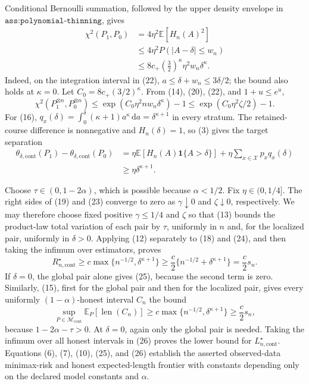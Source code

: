 Conditional Bernoulli summation, followed by the upper density envelope in \(\texttt{ass:polynomial-thinning}\), gives
\[
\begin{aligned}
 \chi^2(P_1,P_0)
 &=4\eta^2\mathbb E[H_n(A)^2]\\
 &\leq4\eta^2P(|A-\delta|\leq w_n)\\
 &\leq 8c_+\left(\frac32\right)^\kappa
       \eta^2w_n\delta^\kappa.
\end{aligned}
\tag{22}
\]
Indeed, on the integration interval in (22), \(a\leq\delta+w_n\leq3\delta/2\); the bound also holds at \(\kappa=0\).  Let \(C_0=8c_+(3/2)^\kappa\).  From (14), (20), (22), and \(1+u\leq e^u\),
\[
 \chi^2(P_1^{\otimes n},P_0^{\otimes n})
 \leq\exp(C_0\eta^2nw_n\delta^\kappa)-1
 \leq\exp(C_0\eta^2\zeta/2)-1.
 \tag{23}
\]
For (16), \(q_x(\delta)=\int_0^\delta(\kappa+1)a^\kappa\,\mathrm da=\delta^{\kappa+1}\) in every stratum.  The retained-course difference is nonnegative and \(H_n(\delta)=1\), so (3) gives the target separation
\[
\begin{aligned}
 \theta_{\delta,\mathrm{cont}}(P_1)-
 \theta_{\delta,\mathrm{cont}}(P_0)
 &=\eta\mathbb E[H_n(A)\mathbf 1\{A>\delta\}]
   +\eta\sum_{x\in\mathcal X}p_xq_x(\delta)\\
 &\geq\eta\delta^{\kappa+1}.
\end{aligned}
\tag{24}
\]

Choose \(\tau\in(0,1-2\alpha)\), which is possible because \(\alpha<1/2\).  Fix \(\eta\in(0,1/4]\).  The right sides of (19) and (23) converge to zero as \(\gamma\downarrow0\) and \(\zeta\downarrow0\), respectively.  We may therefore choose fixed positive \(\gamma\leq1/4\) and \(\zeta\) so that (13) bounds the product-law total variation of each pair by \(\tau\), uniformly in \(n\) and, for the localized pair, uniformly in \(\delta>0\).  Applying (12) separately to (18) and (24), and then taking the infimum over estimators, proves
\[
 R_{n,\mathrm{cont}}^\star
 \geq c\max\{n^{-1/2},\delta^{\kappa+1}\}
 \geq\frac c2\{n^{-1/2}+\delta^{\kappa+1}\}
 =\frac c2s_n.
 \tag{25}
\]
If \(\delta=0\), the global pair alone gives (25), because the second term is zero.  Similarly, (15), first for the global pair and then for the localized pair, gives every uniformly \((1-\alpha)\)-honest interval \(C_n\) the bound
\[
 \sup_{P\in\mathcal M_{\mathrm{cont}}}
 \mathbb E_P[\operatorname{len}(C_n)]
 \geq c\max\{n^{-1/2},\delta^{\kappa+1}\}
 \geq\frac c2s_n,
 \tag{26}
\]
because \(1-2\alpha-\tau>0\).  At \(\delta=0\), again only the global pair is needed.  Taking the infimum over all honest intervals in (26) proves the lower bound for \(L_{n,\mathrm{cont}}^\star\).  Equations (6), (7), (10), (25), and (26) establish the asserted observed-data minimax-risk and honest expected-length frontier with constants depending only on the declared model constants and \(\alpha\).

